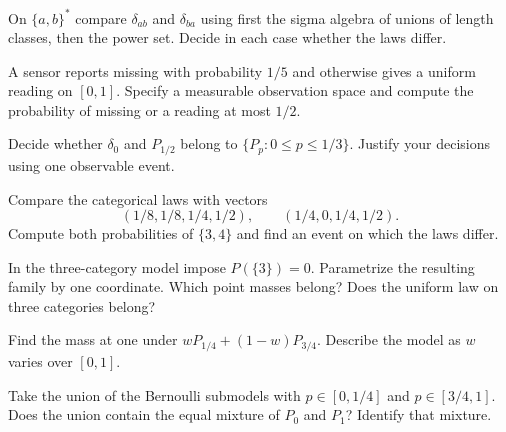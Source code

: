 \documentclass[11pt,oneside]{book}
\theoremstyle{definition}
\theoremstyle{remark}
\begin{document}
\begin{practiceexercise}
\label{wex:length-classes}
On $\{a,b\}^*$ compare $\delta_{ab}$ and $\delta_{ba}$ using first the sigma
algebra of unions of length classes, then the power set. Decide in each case
whether the laws differ.
\end{practiceexercise}

\begin{practiceexercise}
\label{wex:sensor-status}
A sensor reports missing with probability $1/5$ and otherwise gives a
uniform reading on $[0,1]$. Specify a measurable observation space and
compute the probability of missing or a reading at most $1/2$.
\end{practiceexercise}

\begin{practiceexercise}
\label{wex:restricted-bernoulli-model}
Decide whether $\delta_0$ and $P_{1/2}$ belong to $\{P_p:0\le p\le1/3\}$.
Justify your decisions using one observable event.
\end{practiceexercise}

\begin{practiceexercise}
\label{wex:event-categorical}
Compare the categorical laws with vectors
\[
(1/8,1/8,1/4,1/2),\qquad (1/4,0,1/4,1/2).
\]
Compute both probabilities of $\{3,4\}$ and find an event on which the laws
differ.
\end{practiceexercise}

\begin{practiceexercise}
\label{wex:categorical-face}
In the three-category model impose $P(\{3\})=0$. Parametrize the resulting
family by one coordinate. Which point masses belong? Does the uniform law on
three categories belong?
\end{practiceexercise}

\begin{practiceexercise}
\label{wex:two-point-convex}
Find the mass at one under $wP_{1/4}+(1-w)P_{3/4}$. Describe the model as
$w$ varies over $[0,1]$.
\end{practiceexercise}

\begin{practiceexercise}
\label{wex:model-union}
Take the union of the Bernoulli submodels with $p\in[0,1/4]$ and
$p\in[3/4,1]$. Does the union contain the equal mixture of $P_0$ and $P_1$?
Identify that mixture.
\end{practiceexercise}
\end{document}
